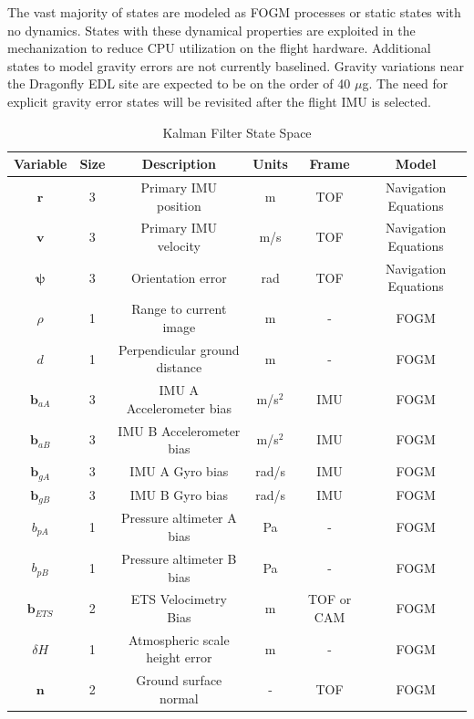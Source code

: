 The vast majority of states are modeled as \ac{FOGM} processes or static states with no dynamics. States with these dynamical properties are exploited in the mechanization to reduce CPU utilization on the flight hardware.\cite{carpenter2018} Additional states to model gravity errors are not currently baselined. Gravity variations near the Dragonfly \ac{EDL} site are expected to be on the order of 40 $\mu$g.\cite{DURANTE2019123} The need for explicit gravity error states will be revisited after the flight IMU is selected. 

\begin{table}[htbp]
	\fontsize{10}{10}\selectfont
    \caption{Kalman Filter State Space}
   \label{tab:state_space}
        \centering 
   \begin{tabular}{| c | c | c | c | c | c |} %
      \hline 
      Variable & Size & Description & Units & Frame & Model \\
      \hline 
     $\bm{r}$ & 3 & Primary \ac{IMU} position & m & \ac{TOF} & Navigation Equations \\ 
     $\bm{v}$ & 3 & Primary \ac{IMU} velocity & m/s & \ac{TOF} & Navigation Equations \\
     $\bm{\psi}$ & 3 & Orientation error & rad & \ac{TOF} & Navigation Equations \\
     $\rho$ & 1 & Range to current image & m & - & \ac{FOGM} \\
     $d$ & 1 & Perpendicular ground distance & m & - & \ac{FOGM} \\ 
      $\bm{b}_{aA}$ & 3 & \ac{IMU} A Accelerometer bias & m/s$^2$ & \ac{IMU} & \ac{FOGM} \\
      $\bm{b}_{aB}$ & 3 & \ac{IMU} B Accelerometer bias & m/s$^2$ & \ac{IMU} & \ac{FOGM} \\
      $\bm{b}_{gA}$ & 3 & IMU A Gyro bias & rad/s & IMU & FOGM \\
      $\bm{b}_{gB}$ & 3 & IMU B Gyro bias & rad/s & IMU & FOGM \\  
      $b_{pA}$ & 1 & Pressure altimeter A bias & Pa & - & FOGM \\
      $b_{pB}$ & 1 & Pressure altimeter B bias & Pa & - & FOGM \\
      $\bm{b}_{ETS}$ & 2 & ETS Velocimetry Bias & m & TOF or CAM & FOGM \\
      $\delta H$ & 1 & Atmospheric scale height error & m & - & FOGM \\
      $\bm{n}$ & 2 & Ground surface normal & - & TOF & FOGM  \\

\end{tabular}
\end{table}
